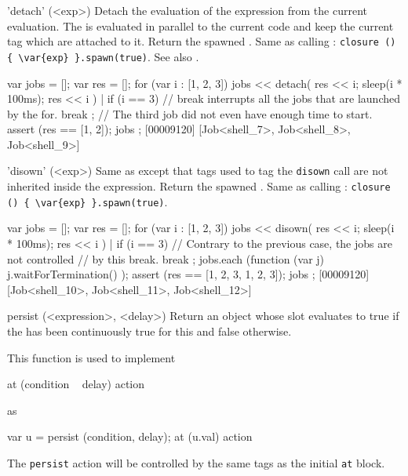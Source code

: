 \begin{urbiscriptapi}
\item['detach'](<exp>)%
  Detach the evaluation of the expression  from the current
  evaluation.  The  is evaluated in parallel to the current code
  and keep the current tag which are attached to it.  Return the spawned
  .  Same as calling :
  \lstinline|closure () { \var{exp} }.spawn(true)|.  See also
  .

\begin{urbiscript}
{
  var jobs = [];
  var res = [];
  for (var i : [1, 2, 3])
  {
    jobs << detach({ res << i; sleep(i * 100ms); res << i }) |
    if (i == 3)
      // break interrupts all the jobs that are launched by the for.
      break
  };
  // The third job did not even have enough time to start.
  assert (res == [1, 2]);
  jobs
};
[00009120] [Job<shell_7>, Job<shell_8>, Job<shell_9>]
\end{urbiscript}


\item['disown'](<exp>)%
  Same as  except that tags used to tag the
  \lstinline|disown| call are not inherited inside the expression.  Return
  the spawned .  Same as calling :
  \lstinline|closure () { \var{exp} }.spawn(true)|.

\begin{urbiscript}
{
  var jobs = [];
  var res = [];
  for (var i : [1, 2, 3])
  {
    jobs << disown({ res << i; sleep(i * 100ms); res << i }) |
    if (i == 3)
      // Contrary to the previous case, the jobs are not controlled
      // by this break.
      break
  };
  jobs.each (function (var j) { j.waitForTermination() });
  assert (res == [1, 2, 3, 1, 2, 3]);
  jobs
};
[00009120] [Job<shell_10>, Job<shell_11>, Job<shell_12>]
\end{urbiscript}


\item[persist](<expression>, <delay>)%
  Return an object whose  slot evaluates to true if the
   has been continuously true for this  and false
  otherwise.

  This function is used to implement

\begin{urbiunchecked}
at (condition ~ delay)
  action
\end{urbiunchecked}

  \noindent
  as

\begin{urbiunchecked}
var u = persist (condition, delay);
at (u.val)
  action
\end{urbiunchecked}

  The \lstinline|persist| action will be controlled by the same tags
  as the initial \lstinline|at| block.
\end{urbiscriptapi}


